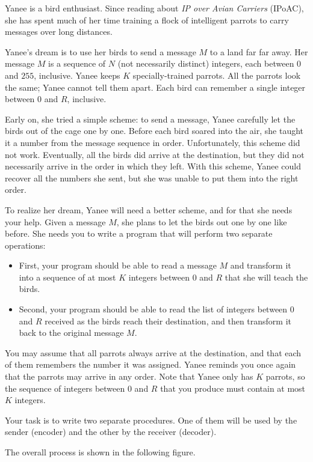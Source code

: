Yanee is a bird enthusiast. Since reading about \textit{IP over Avian Carriers} (IPoAC), she has spent much of her time training a flock of intelligent parrots to carry messages over long distances.

Yanee's dream is to use her birds to send a message $M$ to a land far far away. Her message $M$ is a
sequence of $N$ (not necessarily distinct) integers, each between $0$ and $255$, inclusive. Yanee keeps
$K$ specially-trained parrots. All the parrots look the same; Yanee cannot tell them apart. Each bird
can remember a single integer between $0$ and $R$, inclusive.

Early on, she tried a simple scheme: to send a message, Yanee carefully let the birds out of the
cage one by one. Before each bird soared into the air, she taught it a number from the message sequence in order. Unfortunately, this scheme did not work. Eventually, all the birds did arrive at
the destination, but they did not necessarily arrive in the order in which they left. With this
scheme, Yanee could recover all the numbers she sent, but she was unable to put them into the
right order.

To realize her dream, Yanee will need a better scheme, and for that she needs your help. Given a
message $M$, she plans to let the birds out one by one like before. She needs you to write a program that will perform two separate operations:
\begin{itemize}
\item First, your program should be able to read a message $M$ and transform it into a sequence
of at most $K$ integers between $0$ and $R$ that she will teach the birds.
\item Second, your program should be able to read the list of integers between $0$ and $R$ received
as the birds reach their destination, and then transform it back to the original message $M$.
\end{itemize}
You may assume that all parrots always arrive at the destination, and that each of them remembers the number it was assigned. Yanee reminds you once again that the parrots may arrive in
any order. Note that Yanee only has $K$ parrots, so the sequence of integers between $0$ and $R$ that
you produce must contain at most $K$ integers.

Your task is to write two separate procedures. One of them will be used by the sender (encoder) and the other by
the receiver (decoder).

The overall process is shown in the following figure.

